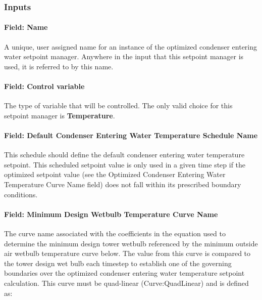 \subsubsection{Inputs}\label{inputs-23-004}

\paragraph{Field: Name}\label{field-name-23-002}

A unique, user assigned name for an instance of the optimized condenser entering water setpoint manager. Anywhere in the input that this setpoint manager is used, it is referred to by this name.

\paragraph{Field: Control variable}\label{field-control-variable-17}

The type of variable that will be controlled. The only valid choice for this setpoint manager is \textbf{Temperature}.

\paragraph{Field: Default Condenser Entering Water Temperature Schedule Name}\label{field-default-condenser-entering-water-temperature-schedule-name}

This schedule should define the default condenser entering water temperature setpoint. This scheduled setpoint value is only used in a given time step if the optimized setpoint value (see the Optimized Condenser Entering Water Temperature Curve Name field) does not fall within its prescribed boundary conditions.

\paragraph{Field: Minimum Design Wetbulb Temperature Curve Name}\label{field-minimum-design-wetbulb-temperature-curve-name}

The curve name associated with the coefficients in the equation used to determine the minimum design tower wetbulb referenced by the minimum outside air wetbulb temperature curve below. The value from this curve is compared to the tower design wet bulb each timestep to establish one of the governing boundaries over the optimized condenser entering water temperature setpoint calculation. This curve must be quad-linear (Curve:QuadLinear) and is defined as:

